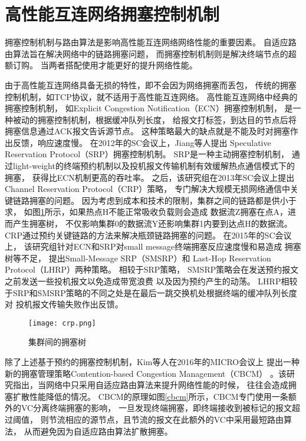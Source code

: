\section{高性能互连网络拥塞控制机制}
拥塞控制机制与路由算法是影响高性能互连网络网络性能的重要因素。
自适应路由算法旨在解决网络中的链路拥塞问题，
而拥塞控制机制则是解决终端节点的超额订购。
当两者搭配使用才能更好的提升网络性能。

由于高性能互连网络具备无损的特性，即不会因为网络拥塞而丢包，
传统的拥塞控制机制，如TCP协议，就不适用于高性能互连网络。
高性能互连网络中经典的拥塞控制机制，
如Explicit Congestion Notification（ECN）拥塞控制机制，
是一种被动的拥塞控制机制，根据缓冲队列长度，
给报文打标签，到达目的节点后将拥塞信息通过ACK报文告诉源节点。
这种策略最大的缺点就是不能及时对拥塞作出反馈，响应速度慢。
在2012年的SC会议上，Jiang等人提出
Speculative Reservation Protocol（SRP）拥塞控制机制。
SRP是一种主动拥塞控制机制，
通过light-weight的终端预约机制以及投机报文传输机制有效缓解热点通信模式下的拥塞，
获得比ECN机制更高的吞吐率。
之后，该研究组在2013年SC会议上提出
Channel Reservation Protocol（CRP）策略，
专门解决大规模无损网络通信中关键链路拥塞的问题。
因为考虑到成本和技术的限制，集群之间的链路都是供小于求，
如图\ref{crp}所示，如果热点H不能正常吸收负载则会造成
数据流Z拥塞在点A，进而产生拥塞树，
不仅影响集群0的数据流Y还影响集群1内要到达点H的数据流。
CRP通过预约关键链路的方法来解决瓶颈链路拥塞的问题。
在2015年的SC会议上，
该研究组针对ECN和SRP对small message终端拥塞反应速度慢和易造成
拥塞树等不足，
提出Small-Message SRP（SMSRP）和
Last-Hop Reservation Protocol（LHRP）两种策略。
相较于SRP策略，
SMSRP策略会在发送预约报文之前发送一些投机报文以免造成带宽浪费
以及因为预约产生的动荡。
LHRP相较于SRP和SMSRP策略的不同之处是在最后一跳交换机处根据终端的缓冲队列长度对
投机报文传输失败作出反馈。

\begin{figure}[htp]
  \centering
    \texttt{[image: crp.png]}
    \caption{集群间的拥塞树}
       \label{crp}
\end{figure}

除了上述基于预约的拥塞控制机制，Kim等人在2016年的MICRO会议上
提出一种新的拥塞管理策略Contention-based Congestion Management（CBCM）
。该研究指出，当网络中只采用自适应路由算法来提升网络性能的时候，
往往会造成拥塞扩散性能降低的情况。
CBCM的原理如图\ref{cbcm}所示，CBCM专门使用一条额外的VC分离终端拥塞的影响，
一旦发现终端拥塞，即终端接收到被标记的报文超过阈值，
则节流相应的源节点，且节流的报文在此额外的VC中采用最短路由算法，
从而避免因为自适应路由算法扩散拥塞。

